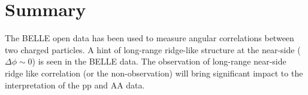 \section{Summary}

The BELLE open data has been used to measure angular correlations between
two charged particles. A hint of long-range ridge-like structure at the
near-side ($\Delta\phi\sim 0$) is seen in the BELLE data. The observation of
long-range near-side ridge like correlation (or the non-observation) will
bring significant impact to the interpretation of the pp and AA data.
